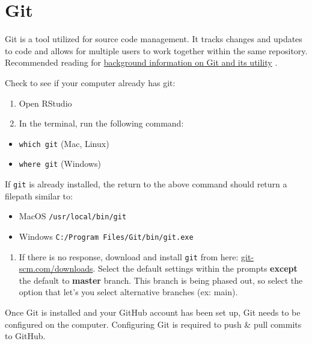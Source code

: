 \documentclass[
]{book}
\providecommand{\tightlist}{%
  \setlength{\itemsep}{0pt}\setlength{\parskip}{0pt}}
\begin{document}
\hypertarget{git-1}{%
\section{Git}\label{git-1}}

Git is a tool utilized for source code management. It tracks changes and updates to code and allows for multiple users to work together within the same repository. Recommended reading for \href{https://towardsdatascience.com/what-is-git-and-why-is-it-so-important-dce559b27833}{background information on Git and its utility} \citep{Yıldırım_2020}.

Check to see if your computer already has git:

\begin{enumerate}
\def\labelenumi{\arabic{enumi}.}
\tightlist
\item
  Open RStudio
\item
  In the terminal, run the following command:
\end{enumerate}

\begin{itemize}
\tightlist
\item
  \texttt{which\ git} (Mac, Linux)
\item
  \texttt{where\ git} (Windows)
\end{itemize}

If \texttt{git} is already installed, the return to the above command should return a filepath similar to:

\begin{itemize}
\tightlist
\item
  MacOS \texttt{/usr/local/bin/git}
\item
  Windows \texttt{C:/Program\ Files/Git/bin/git.exe}
\end{itemize}

\begin{enumerate}
\def\labelenumi{\arabic{enumi}.}
\setcounter{enumi}{2}
\tightlist
\item
  If there is no response, download and install \texttt{git} from here: \href{https://git-scm.com/downloads}{git-scm.com/downloads}. Select the default settings within the prompts \textbf{except} the default to \textbf{master} branch. This branch is being phased out, so select the option that let's you select alternative branches (ex: main).
\end{enumerate}

Once Git is installed and your GitHub account has been set up, Git needs to be configured on the computer. Configuring Git is required to push \& pull commits to GitHub.
\end{document}
